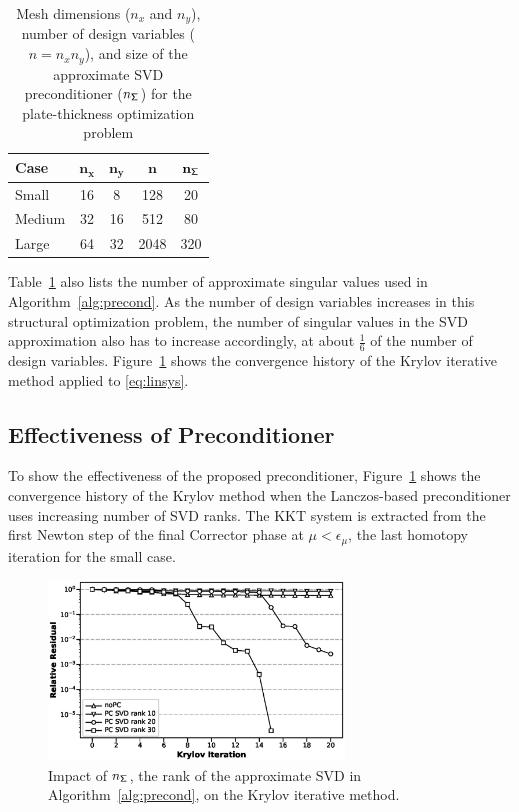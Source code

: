 \begin{table}[tbp]
  \begin{center}
    \caption{Mesh dimensions ($n_x$ and $n_y$), number of design variables ($n =
      n_x n_y$), and size of the approximate SVD preconditioner
      ($n_{\mathsf{\Sigma}}$) for the plate-thickness optimization
      problem \label{tab:mesh_sizes}}
  \begin{tabular}{ l c c c c}
    \textbf{Case} & $\mathbf{n_x}$  & $\mathbf{n_y}$ & $\mathbf{n}$
    & $\mathbf{{n_{\mathsf{\Sigma}}}}$
    \\ \hline
    \rule{0ex}{3ex}%
    Small  &   16 & 8  & 128  & 20 \\ 
    Medium &   32 & 16 & 512  & 80 \\  
    Large  &   64 & 32 & 2048 & 320  
  \end{tabular}
  \end{center}
\end{table}

Table~\ref{tab:mesh_sizes} also lists the number of approximate singular values
used in Algorithm~\ref{alg:precond}.  As the number of design variables
increases in this structural optimization problem, the number of singular values
in the SVD approximation also has to increase accordingly, at about $\frac{1}{6}$
of the number of design variables.
Figure~\ref{fig:svdrank} shows the convergence history of the Krylov iterative
method applied to \eqref{eq:linsys}.  

\subsection{Effectiveness of Preconditioner}
To show the effectiveness of the proposed preconditioner, 
Figure~\ref{fig:svdrank} shows the convergence history of the Krylov
method when the Lanczos-based preconditioner uses 
increasing number of SVD ranks. The KKT system is extracted from 
the first Newton step of the final Corrector phase 
at $\mu < \epsilon_{\mu}$, the last homotopy iteration for the small case. 

\begin{figure}[tbp]
  \centering
  \includegraphics[width=0.7\textwidth]{./figs/chap6_fstopo/tiny_svd_ranks.eps}
  \caption{Impact of $n_{\mathsf{\Sigma}}$, the rank of the approximate SVD in
    Algorithm~\ref{alg:precond}, on the Krylov iterative method.
  \label{fig:svdrank}}
\end{figure}

